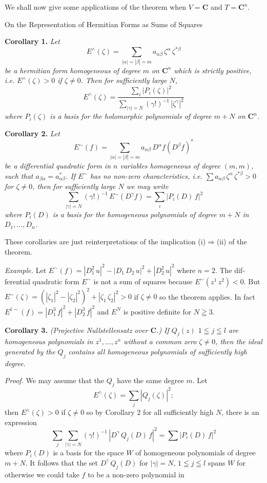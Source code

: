 We shall now give some applications of the theorem when $V = \mathbf{C}$
and $T = \mathbf{C}^n$.


On the Representation of Hermitian Forms as Sums of Squares 

\textbf{Corollary 1.} \emph{Let}
\[ E^{\wedge}(\zeta)=\sum_{|\alpha|=|\beta|=m} a_{\alpha\beta}\,\zeta^{\alpha}\,\zeta^{*\beta} \]
\emph{be a hermitian form homogeneous of degree $m$ on $\mathbf{C}^n$ which is strictly
positive, i.e. $E^{\wedge}(\zeta)>0$ if $\zeta\neq 0$. Then for sufficiently large $N$,}
\[ E^{\wedge}(\zeta)=\frac{\sum\limits_{i}|P_i(\zeta)|^2}{\sum\limits_{|\gamma|=N}(\gamma!)^{-1}\,|\zeta^{\gamma}|^2} \]
\emph{where $P_i(\zeta)$ is a basis for the holomorphic polynomials of degree $m+N$ on $\mathbf{C}^n$.}

\textbf{Corollary 2.} \emph{Let}
\[ E^{\sim}(f)=\sum_{|\alpha|=|\beta|=m} a_{\alpha\beta}\,D^{\alpha}f(D^{\beta}f)^* \]
\emph{be a differential quadratic form in $n$ variables homogeneous of degree
$(m,m)$, such that $a_{\beta\alpha}=a^*_{\alpha\beta}$. If $E^{\sim}$ has no non-zero characteristics, i.e.
$\sum a_{\alpha\beta}\,\zeta^{\alpha}\,\zeta^{*\beta}>0$ for $\zeta\neq 0$, then for sufficiently large $N$ we may write}
\[ \sum_{|\gamma|=N}(\gamma!)^{-1}\,E^{\sim}(D^{\gamma}f)=\sum_{i}|P_i(D)\,f|^2 \]
\emph{where $P_i(D)$ is a basis for the homogeneous polynomials of degree $m+N$
in $D_1,\dots,D_n$.}

These corollaries are just reinterpretations of the implication (i)$\Rightarrow$(ii)
of the theorem.

\emph{Example.} Let $E^{\sim}(f)=|D_1^2\,u|^2-|D_1\,D_2\,u|^2+|D_2^2\,u|^2$ where $n=2$. The dif-%
ferential quadratic form $E^{\sim}$ is not a sum of squares because $E^{\sim}(z^1\,z^2)<0$.
But $E^{\sim}(\zeta)=(|\zeta_1|^2-|\zeta_2|^2)^2+|\zeta_1\,\zeta_2|^2>0$ if $\zeta\neq 0$ so the theorem applies.
In fact $E^{1\sim}(f)=|D_1^3\,f|^2+|D_2^3\,f|^2$ and $E^N$ is positive definite for $N\geqq 3$.

\textbf{Corollary 3.} \emph{(Projective Nullstellensatz over $\mathbf{C}$.) If $Q_j(z)$ $1\leqq j\leqq l$ are
homogeneous polynomials in $z^1,\dots,z^n$ without a common zero $\zeta\neq 0$, then
the ideal generated by the $Q_j$ contains all homogeneous polynomials of
sufficiently high degree.}

\emph{Proof.} We may assume that the $Q_j$ have the same degree $m$. Let
\[ E^{\wedge}(\zeta)=\sum_{j}|Q_j(\zeta)|^2; \]
then $E^{\wedge}(\zeta)>0$ if $\zeta\neq 0$ so by Corollary 2 for all sufficiently high $N$, there
is an expression
\[ \sum_{j}\sum_{|\gamma|=N}(\gamma!)^{-1}\,|D^{\gamma}\,Q_j(D)\,f|^2=\sum|P_i(D)\,f|^2 \]
where $P_i(D)$ is a basis for the space $W$ of homogeneous polynomials
of degree $m+N$. It follows that the set $D^{\gamma}\,Q_j(D)$ for $|\gamma|=N$, $1\leqq j\leqq l$
spans $W$ for otherwise we could take $f$ to be a non-zero polynomial in

